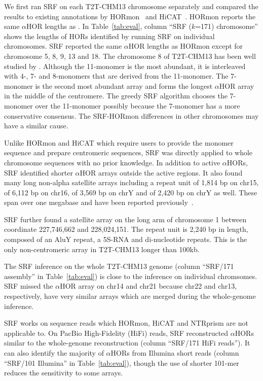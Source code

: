 \documentclass{bioinfo}
\begin{document}
We first ran SRF on each T2T-CHM13
chromosome separately and compared the results to existing annotations by
HORmon~\citep{Kunyavskaya:2022tx} and HiCAT~\citep{Gao2022.08.07.502881}.
HORmon reports the same $\alpha$HOR lengths as \citet{Altemose:2022tv}.
In Table~\ref{tab:eval}, column ``SRF ($k$=171) chromosome'' shows the lengths
of HORs identified by running SRF on individual chromosomes.  SRF
reported the same $\alpha$HOR lengths as HORmon except for chromosome 5, 8, 9,
13 and 18. The chromosome 8 of T2T-CHM13 has been well studied by
\citet{Logsdon:2021aa}. Although the 11-monomer is the most abundant, it is
interleaved with 4-, 7- and 8-monomers that are derived from the 11-monomer.
The 7-monomer is the second most abundant array and forms the longest
$\alpha$HOR array in the middle of the centromere. The greedy SRF algorithm
chooses the 7-monomer over the 11-monomer possibly because the 7-monomer
has a more conservative consensus. The SRF-HORmon differences in other
chromosomes may have a similar cause.

Unlike HORmon and HiCAT which require users to provide the monomer
sequence and prepare centromeric sequences, SRF was directly applied to
whole chromosome sequences with no prior knowledge. In addition to active
$\alpha$HORs, SRF identified shorter $\alpha$HOR arrays outside the active
regions. It also found many long non-alpha satellite arrays including a repeat
unit of 1,814 bp on chr15, of 6,112 bp on chr16, of 3,569 bp on chrY and of
2,420 bp on chrY as well. These span over one megabase and have been reported
previously~\citep{Altemose:2022vw}.

SRF further found a satellite array on the long arm of chromosome 1 between
coordinate 227,746,662 and 228,024,151. The repeat unit is 2,240 bp in length,
composed of an AluY repeat, a 5S-RNA and di-nucleotide repeats. This is the
only non-centromeric array in T2T-CHM13 longer than 100kb.

The SRF inference on the whole T2T-CHM13 genome (column ``SRF/171 assembly'' in
Table~\ref{tab:eval}) is close to the inference on individual chromsomes. SRF
missed the $\alpha$HOR array on chr14 and chr21 because chr22 and chr13,
respectively, have very similar arrays which are merged during the whole-genome
inference.

SRF works on sequence reads which HORmon, HiCAT and NTRprism are not
applicable to. On PacBio High-Fidelity (HiFi) reads, SRF reconstructed
$\alpha$HORs similar to the whole-genome reconstruction (column ``SRF/171 HiFi
reads''). It can also identify the majority of $\alpha$HORs from Illumina short
reads (column ``SRF/101 Illumina'' in Table~\ref{tab:eval}), though the use of
shorter 101-mer reduces the sensitivity to some arrays.
\end{document}
